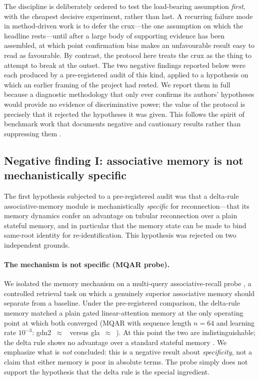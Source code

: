 The discipline is deliberately ordered to test the load-bearing assumption
\emph{first}, with the cheapest decisive experiment, rather than last. A
recurring failure mode in method-driven work is to defer the crux---the one
assumption on which the headline rests---until after a large body of
supporting evidence has been assembled, at which point confirmation bias
makes an unfavourable result easy to read as favourable. By contrast, the
protocol here treats the crux as the thing to attempt to break at the
outset. The two negative findings reported below were each produced by a
pre-registered audit of this kind, applied to a hypothesis on which an
earlier framing of the project had rested. We report them in full because a
diagnostic methodology that only ever confirms its authors' hypotheses would
provide no evidence of discriminative power; the value of the protocol is
precisely that it rejected the hypotheses it was given. This follows the
spirit of benchmark work that documents negative and cautionary results
rather than suppressing them \cite{TODO_dandb_negative}.

\subsection{Negative finding I: associative memory is not mechanistically specific}
\label{sec:diagnostics:memory}

The first hypothesis subjected to a pre-registered audit was that a
delta-rule associative-memory module is mechanistically \emph{specific} for
reconnection---that its memory dynamics confer an advantage on tubular
reconnection over a plain stateful memory, and in particular that the memory
state can be made to bind same-root identity for re-identification. This
hypothesis was rejected on two independent grounds.

\paragraph{The mechanism is not specific (MQAR probe).}
We isolated the memory mechanism on a multi-query associative-recall
probe \cite{TODO_mqar}, a controlled retrieval task on which a
genuinely superior associative memory should separate from a baseline. Under
the pre-registered comparison, the delta-rule memory matched a plain gated
linear-attention memory at the only operating point at which both converged
(MQAR with sequence length $n{=}64$ and learning rate $10^{-3}$:
gdn2~$\approx$~ versus
gla~$\approx$~). At this point the two are
indistinguishable; the delta rule shows no advantage over a standard stateful
memory \cite{TODO_deltanet}. We emphasize what is \emph{not} concluded:
this is a negative result about \emph{specificity}, not a claim that either
memory is poor in absolute terms. The probe simply does not support the
hypothesis that the delta rule is the special ingredient.

